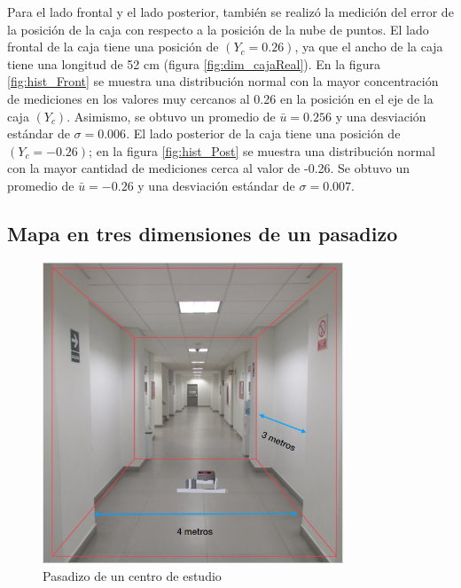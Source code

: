 

Para el lado frontal y el lado posterior, también se realizó la medición del error de la
posición de la caja con respecto a la posición de la nube de puntos. El lado frontal de la
caja tiene una posición de $(Y_{c} = 0.26)$, ya que el ancho de la caja tiene una longitud
de 52 cm (figura \ref{fig:dim_cajaReal}). En la figura \ref{fig:hist_Front} se muestra una 
distribución normal con la mayor concentración de mediciones en los valores muy cercanos al 
0.26 en la posición en el eje de la caja $(Y_{c})$. Asimismo, se obtuvo un promedio de $\bar{u} 
= 0.256$ y una desviación estándar de $\sigma = 0.006$. El lado posterior de la caja tiene 
una posición de $(Y_{c} = -0.26)$; en la figura \ref{fig:hist_Post} se muestra una distribución
normal con la mayor cantidad de mediciones cerca al valor de -0.26. Se obtuvo un promedio de 
$\bar{u} = -0.26$ y una desviación estándar de $\sigma = 0.007$.

\subsection{Mapa en tres dimensiones de un pasadizo}
\begin{figure}
  \centering \footnotesize
  \includegraphics[width=0.80\textwidth]{images/esan_lidar.PNG}
  \captionsetup{font=footnotesize}
  \caption{Pasadizo de un centro de estudio}
  \label{fig:pasadizoEsan}
\end{figure}

